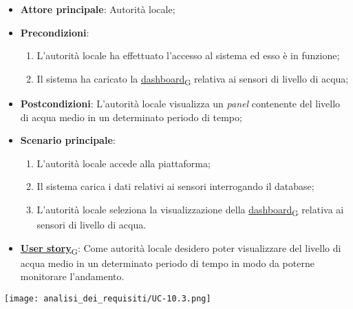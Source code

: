 \begin{itemize}
	\item \textbf{Attore principale}: Autorità locale;
	\item \textbf{Precondizioni}:
	      \begin{enumerate}
		      \item L'autorità locale ha effettuato l'accesso al sistema ed esso è in funzione;
		      \item Il sistema ha caricato la \href{https://7last.github.io/docs/rtb/documentazione-interna/glossario\#dashboard}{dashboard\textsubscript{G}} relativa ai sensori di livello di acqua;
	      \end{enumerate}
	\item \textbf{Postcondizioni}: L'autorità locale visualizza un \textit{panel} contenente del livello di acqua medio in un determinato periodo di tempo;
	\item \textbf{Scenario principale}:
	      \begin{enumerate}
		      \item L'autorità locale accede alla piattaforma;
		      \item Il sistema carica i dati relativi ai sensori interrogando il database;
		      \item L'autorità locale seleziona la visualizzazione della \href{https://7last.github.io/docs/rtb/documentazione-interna/glossario\#dashboard}{dashboard\textsubscript{G}} relativa ai sensori di livello di acqua.
	      \end{enumerate}
	\item \href{https://7last.github.io/docs/rtb/documentazione-interna/glossario\#user-story}{\textbf{User story}\textsubscript{G}}:
	      Come autorità locale desidero poter visualizzare del livello di acqua medio in un determinato periodo di tempo
	      in modo da poterne monitorare l'andamento.
\end{itemize}
\begin{center}
	\texttt{[image: analisi\_dei\_requisiti/UC-10.3.png]}
\end{center}

